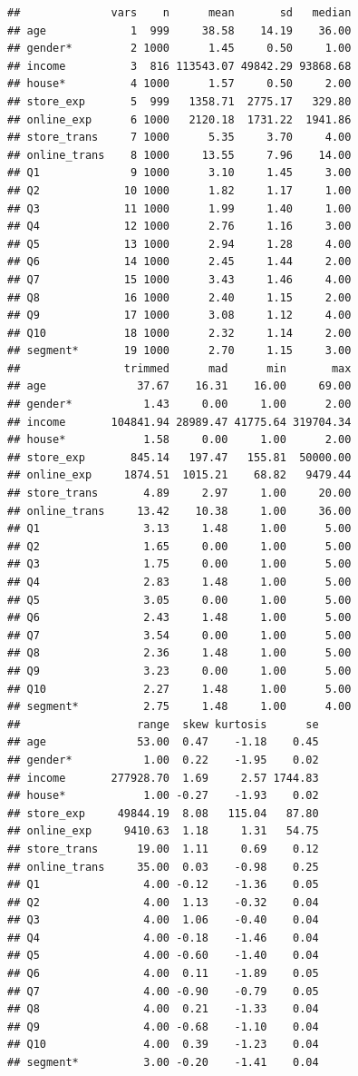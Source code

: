 \documentclass[12pt,]{krantz}
\theoremstyle{definition}
\theoremstyle{definition}
\theoremstyle{remark}
\begin{document}
\begin{verbatim}
##              vars    n      mean       sd   median
## age             1  999     38.58    14.19    36.00
## gender*         2 1000      1.45     0.50     1.00
## income          3  816 113543.07 49842.29 93868.68
## house*          4 1000      1.57     0.50     2.00
## store_exp       5  999   1358.71  2775.17   329.80
## online_exp      6 1000   2120.18  1731.22  1941.86
## store_trans     7 1000      5.35     3.70     4.00
## online_trans    8 1000     13.55     7.96    14.00
## Q1              9 1000      3.10     1.45     3.00
## Q2             10 1000      1.82     1.17     1.00
## Q3             11 1000      1.99     1.40     1.00
## Q4             12 1000      2.76     1.16     3.00
## Q5             13 1000      2.94     1.28     4.00
## Q6             14 1000      2.45     1.44     2.00
## Q7             15 1000      3.43     1.46     4.00
## Q8             16 1000      2.40     1.15     2.00
## Q9             17 1000      3.08     1.12     4.00
## Q10            18 1000      2.32     1.14     2.00
## segment*       19 1000      2.70     1.15     3.00
##                trimmed      mad      min       max
## age              37.67    16.31    16.00     69.00
## gender*           1.43     0.00     1.00      2.00
## income       104841.94 28989.47 41775.64 319704.34
## house*            1.58     0.00     1.00      2.00
## store_exp       845.14   197.47   155.81  50000.00
## online_exp     1874.51  1015.21    68.82   9479.44
## store_trans       4.89     2.97     1.00     20.00
## online_trans     13.42    10.38     1.00     36.00
## Q1                3.13     1.48     1.00      5.00
## Q2                1.65     0.00     1.00      5.00
## Q3                1.75     0.00     1.00      5.00
## Q4                2.83     1.48     1.00      5.00
## Q5                3.05     0.00     1.00      5.00
## Q6                2.43     1.48     1.00      5.00
## Q7                3.54     0.00     1.00      5.00
## Q8                2.36     1.48     1.00      5.00
## Q9                3.23     0.00     1.00      5.00
## Q10               2.27     1.48     1.00      5.00
## segment*          2.75     1.48     1.00      4.00
##                  range  skew kurtosis      se
## age              53.00  0.47    -1.18    0.45
## gender*           1.00  0.22    -1.95    0.02
## income       277928.70  1.69     2.57 1744.83
## house*            1.00 -0.27    -1.93    0.02
## store_exp     49844.19  8.08   115.04   87.80
## online_exp     9410.63  1.18     1.31   54.75
## store_trans      19.00  1.11     0.69    0.12
## online_trans     35.00  0.03    -0.98    0.25
## Q1                4.00 -0.12    -1.36    0.05
## Q2                4.00  1.13    -0.32    0.04
## Q3                4.00  1.06    -0.40    0.04
## Q4                4.00 -0.18    -1.46    0.04
## Q5                4.00 -0.60    -1.40    0.04
## Q6                4.00  0.11    -1.89    0.05
## Q7                4.00 -0.90    -0.79    0.05
## Q8                4.00  0.21    -1.33    0.04
## Q9                4.00 -0.68    -1.10    0.04
## Q10               4.00  0.39    -1.23    0.04
## segment*          3.00 -0.20    -1.41    0.04
\end{verbatim}
\end{document}
